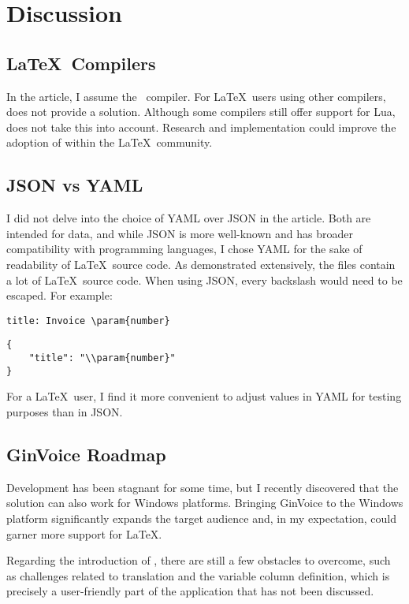 \section{Discussion}

\subsection{\LaTeX\ Compilers}
In the article, I assume the \LuaLaTeX\ compiler.
For \LaTeX\ users using other compilers,  does not provide a solution.
Although some compilers still offer support for Lua,  does not take this into account.
Research and implementation could improve the adoption of  within the \LaTeX\ community.

\subsection{JSON vs YAML}
I did not delve into the choice of YAML over JSON in the article.
Both are intended for data, and while JSON is more well-known and has broader compatibility with programming languages, I chose YAML for the sake of readability of \LaTeX\ source code.
As demonstrated extensively, the files contain a lot of \LaTeX\ source code.
When using JSON, every backslash would need to be escaped.
For example:
\begin{lstlisting}[style=yaml,caption={YAML example}]
title: Invoice \param{number}
\end{lstlisting}
\begin{lstlisting}[style=json,caption={JSON example}]
{
    "title": "\\param{number}"
}
\end{lstlisting}
For a \LaTeX\ user, I find it more convenient to adjust values in YAML for testing purposes than in JSON.

\subsection{GinVoice Roadmap}
Development has been stagnant for some time, but I recently discovered that the solution can also work for Windows platforms.
Bringing GinVoice to the Windows platform significantly expands the target audience and, in my expectation, could garner more support for \LaTeX.

Regarding the introduction of , there are still a few obstacles to overcome, such as challenges related to translation and the variable column definition, which is precisely a user-friendly part of the application that has not been discussed.
